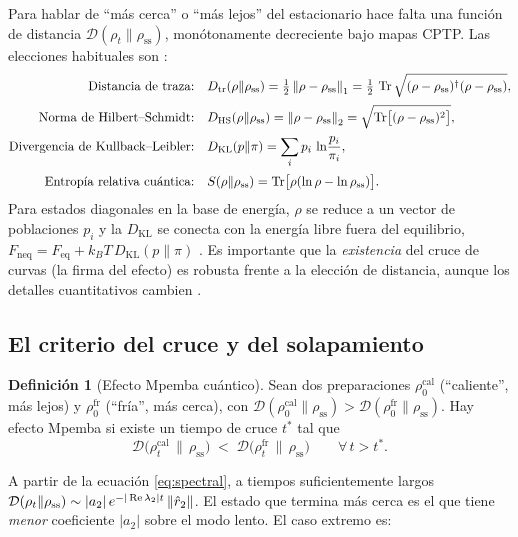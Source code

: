 \documentclass[11pt,a4paper]{article}
\theoremstyle{definition}
\newtheorem{definicion}{Definición}[section]
\theoremstyle{plain}
\newcommand{\Dop}{\mathcal{D}}
\newcommand{\rss}{\rho_{\mathrm{ss}}}
\renewcommand{\Tr}{\operatorname{Tr}}
\begin{document}
Para hablar de ``más cerca'' o ``más lejos'' del estacionario hace falta una función de distancia
$\Dop(\rho_t\|\rss)$, monótonamente decreciente bajo mapas CPTP. Las elecciones habituales son
\cite{KumarBechhoefer2020,LiYang2026,Alyuruk2025}:
\begin{align}
\text{Distancia de traza:}\quad & D_{\mathrm{tr}}(\rho\|\rss)=\tfrac12\,\norm{\rho-\rss}_1
=\tfrac12\,\Tr\sqrt{(\rho-\rss)^{\dagger}(\rho-\rss)},\\[2pt]
\text{Norma de Hilbert--Schmidt:}\quad & D_{\mathrm{HS}}(\rho\|\rss)=\norm{\rho-\rss}_2
=\sqrt{\Tr\!\big[(\rho-\rss)^2\big]},\\[2pt]
\text{Divergencia de Kullback--Leibler:}\quad & D_{\mathrm{KL}}(p\|\pi)=\sum_i p_i\,\ln\!\frac{p_i}{\pi_i},\\[2pt]
\text{Entropía relativa cuántica:}\quad & S(\rho\|\rss)=\Tr\!\big[\rho(\ln\rho-\ln\rss)\big].
\end{align}
Para estados diagonales en la base de energía, $\rho$ se reduce a un vector de poblaciones $p_i$ y la
$D_{\mathrm{KL}}$ se conecta con la energía libre fuera del equilibrio,
$F_{\mathrm{neq}}=F_{\mathrm{eq}}+k_BT\,D_{\mathrm{KL}}(p\|\pi)$
\cite{KumarBechhoefer2020}. Es importante que la \emph{existencia} del cruce de curvas (la firma del
efecto) es robusta frente a la elección de distancia, aunque los detalles cuantitativos cambien
\cite{KumarBechhoefer2020}.

\subsection{El criterio del cruce y del solapamiento}

\begin{definicion}[Efecto Mpemba cuántico]
Sean dos preparaciones $\rho^{\mathrm{cal}}_0$ (``caliente'', más lejos) y $\rho^{\mathrm{fr}}_0$
(``fría'', más cerca), con
$\Dop(\rho^{\mathrm{cal}}_0\|\rss) > \Dop(\rho^{\mathrm{fr}}_0\|\rss)$.
Hay efecto Mpemba si existe un tiempo de cruce $t^{*}$ tal que
\begin{equation}
\Dop\!\big(\rho^{\mathrm{cal}}_{t}\,\|\,\rss\big) \;<\; \Dop\!\big(\rho^{\mathrm{fr}}_{t}\,\|\,\rss\big)
\qquad \forall\, t> t^{*}.
\end{equation}
\end{definicion}

A partir de la ecuación \eqref{eq:spectral}, a tiempos suficientemente largos
$\Dop(\rho_t\|\rss)\sim |a_2|\,e^{-|\operatorname{Re}\lambda_2| t}\,\norm{\hat r_2}$. El estado que termina
más cerca es el que tiene \emph{menor} coeficiente $|a_2|$ sobre el modo lento. El caso extremo es:
\end{document}
